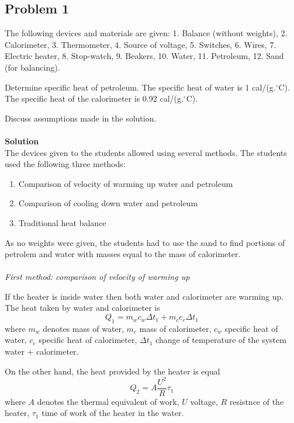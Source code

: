 \documentclass[12pt,a4paper]{book}
\begin{document}
	\subsection*{Problem 1}
	The following devices and materials are given: 1. Balance (without weights), 2. Calorimeter, 3. Thermometer, 4. Source of voltage, 5. Switches, 6. Wires, 7. Electric heater, 8. Stop-watch, 9. Beakers, 10. Water, 11. Petroleum, 12. Sand (for balancing).\par
	Determine specif\mbox{}ic heat of petroleum. The specif\mbox{}ic heat of water is 1 cal/(g.$^{\circ}\mathrm{C}$). The specif\mbox{}ic heat of the calorimeter is 0.92 cal/(g.$^{\circ}\mathrm{C}$).\par
	Discuss assumptions made in the solution.\\ \\
	\textbf{Solution}\\
	The devices given to the students allowed using several methods. The students used the following three methods:
	\begin{enumerate}
		\item Comparison of velocity of warming up water and petroleum
		\item Comparison of cooling down water and petroleum
		\item Traditional heat balance
	\end{enumerate}\par
	As no weights were given, the students had to use the sand to f\mbox{}ind portions of petrolem and water with masses equal to the mass of calorimeter.\\ \\
	\filbreak\noindent\emph{First method: comparison of velocity of warming up}\par
	If the heater is inside water then both water and calorimeter are warming up. The heat taken by water and calorimeter is
	\begin{equation*}
		Q_1=m_wc_w\Delta t_1+m_cc_c\Delta t_1
	\end{equation*}
	where $m_w$ denotes mass of water, $m_c$ mass of calorimeter, $c_w$ specific heat of water, $c_c$ specific heat of calorimeter, $\Delta t_1$ change of temperature of the system water + calorimeter.\par
	On the other hand, the heat provided by the heater is equal
	\begin{equation*}
		Q_2=A\frac{U^2}{R}\tau_1
	\end{equation*}
	where $A$ denotes the thermal equivalent of work, $U$ voltage, $R$ resistnce of the heater, $\tau_1$ time of work of the heater in the water.\par
\end{document}

